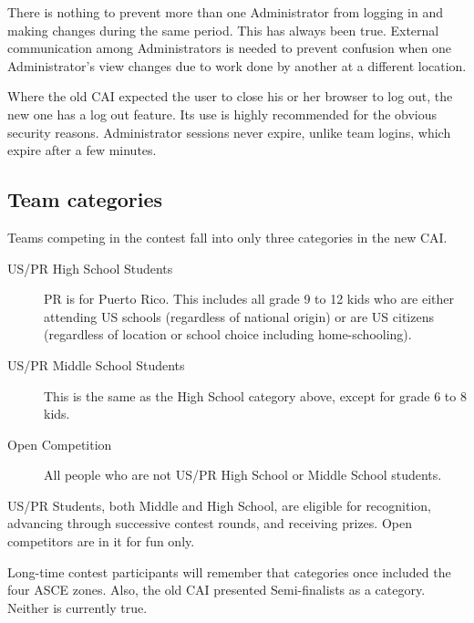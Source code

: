 \documentclass[11pt,letterpaper]{refart}
\begin{document}
There is nothing to prevent more than one Administrator from logging in 
and making changes during the same period. This has always been true. 
External communication among Administrators is needed to prevent
confusion when one Administrator's view changes due to work done by
another at a different location.

Where the old CAI expected the user to close his or her browser to log out, the
new one has a log out feature. Its use is highly recommended for the obvious
security reasons. Administrator sessions never expire, unlike team logins, which
expire after a few minutes.

\subsection{Team categories}
Teams competing in the contest fall into only three categories in the new CAI.
\begin{description}
\item[US/PR High School Students]  PR is for Puerto Rico. This includes all 
grade 9 to 12
kids who are either attending US schools (regardless of national origin) or are
US citizens (regardless of location or school choice including home-schooling).
\item[US/PR Middle School Students]  This is the same as the High School
category above, except for grade 6 to 8 kids.
\item[Open Competition]  All people who are not US/PR High School
or Middle School students.
\end{description}
US/PR Students, both Middle and High School, are eligible for recognition, 
advancing through successive
contest rounds, and receiving prizes. Open competitors are in it for fun only.

Long-time contest participants will remember that categories once included the
four ASCE zones. Also, the old CAI presented Semi-finalists as a category.
Neither is currently true.
\end{document}
